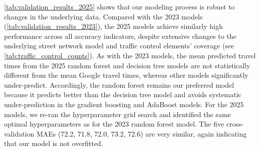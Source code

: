 \documentclass[12pt,letterpaper]{article} %
\begin{document}
\autoref{tab:validation_results_2025} shows that our modeling process is robust to changes in the underlying data. Compared with the 2023 models (\autoref{tab:validation_results_2023}), the 2025 models achieve similarly high performance across all accuracy indicators, despite extensive changes to the underlying street network model and traffic control elements' coverage (see \autoref{tab:traffic_control_counts}). As with the 2023 models, the mean predicted travel times from the 2025 random forest and decision tree models are not statistically different from the mean Google travel times, whereas other models significantly under-predict. Accordingly, the random forest remains our preferred model because it predicts better than the decision tree model and avoids systematic under-prediction in the gradient boosting and AdaBoost models. For the 2025 models, we re-ran the hyperparameter grid search and identified the same optimal hyperparameters as for the 2023 random forest model. The five cross-validation MAEs (72.2, 71.8, 72.0, 73.2, 72.6) are very similar, again indicating that our model is not overfitted.

\begin{table}[tb!]
    \centering\small
    \caption{Out-of-sample prediction accuracy of the 2025 model (chosen random forest model in bold) versus the initial naïve travel time model and the discarded alternative models. $n$ = 8,073 for each. Accuracy indicators are the same as defined in \autoref{tab:validation_results_2023}.}\label{tab:validation_results_2025}
\end{table}
\end{document}
